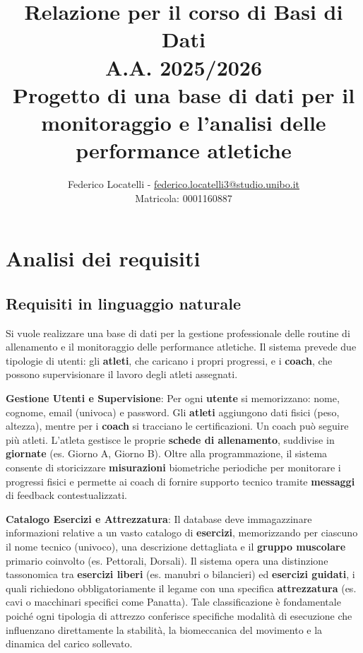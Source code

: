 \documentclass[12pt]{report}
\title{
    Relazione per il corso di Basi di Dati \\
    A.A. 2025/2026 \\
    \textbf{Progetto di una base di dati per il monitoraggio e l'analisi delle performance atletiche}
}
\author{
    Federico Locatelli - \href{mailto:federico.locatelli3@studio.unibo.it}{federico.locatelli3@studio.unibo.it} \\
    Matricola: 0001160887
}
\date{}
\begin{document}
\maketitle

\tableofcontents 
\newpage

\chapter{Analisi dei requisiti}

\section{Requisiti in linguaggio naturale}
Si vuole realizzare una base di dati per la gestione professionale delle routine di allenamento e il monitoraggio delle performance atletiche. Il sistema prevede due tipologie di utenti: gli \textbf{atleti}, che caricano i propri progressi, e i \textbf{coach}, che possono supervisionare il lavoro degli atleti assegnati.

\textbf{Gestione Utenti e Supervisione}:
Per ogni \textbf{utente} si memorizzano: nome, cognome, email (univoca) e password. Gli \textbf{atleti} aggiungono dati fisici (peso, altezza), mentre per i \textbf{coach} si tracciano le certificazioni. Un coach può seguire più atleti. L'atleta gestisce le proprie \textbf{schede di allenamento}, suddivise in \textbf{giornate} (es. Giorno A, Giorno B). Oltre alla programmazione, il sistema consente di storicizzare \textbf{misurazioni} biometriche periodiche per monitorare i progressi fisici e permette ai coach di fornire supporto tecnico tramite \textbf{messaggi} di feedback contestualizzati.

\textbf{Catalogo Esercizi e Attrezzatura}:
Il database deve immagazzinare informazioni relative a un vasto catalogo di \textbf{esercizi}, memorizzando per ciascuno il nome tecnico (univoco), una descrizione dettagliata e il \textbf{gruppo muscolare} primario coinvolto (es. Pettorali, Dorsali). Il sistema opera una distinzione tassonomica tra \textbf{esercizi liberi} (es. manubri o bilancieri) ed \textbf{esercizi guidati}, i quali richiedono obbligatoriamente il legame con una specifica \textbf{attrezzatura} (es. cavi o macchinari specifici come Panatta). Tale classificazione è fondamentale poiché ogni tipologia di attrezzo conferisce specifiche modalità di esecuzione che influenzano direttamente la stabilità, la biomeccanica del movimento e la dinamica del carico sollevato.
\end{document}
